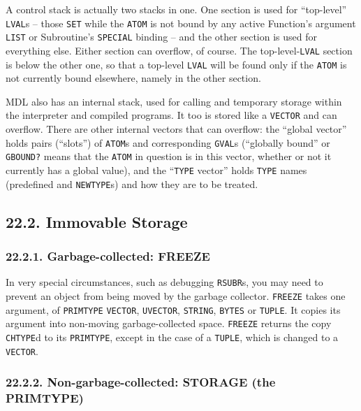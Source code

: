 \documentclass[a4paper,]{article}
\begin{document}
A control stack is actually two stacks in one. One section is used for ``top-level'' \texttt{LVAL}s -- those \texttt{SET}
while the \texttt{ATOM} is not bound by any active Function's argument \texttt{LIST} or Subroutine's
\texttt{SPECIAL} binding -- and the other section is used for everything else. Either section can
overflow, of course. The top-level-\texttt{LVAL} section is below the other one, so that a top-level \texttt{LVAL} will be
found only if the \texttt{ATOM} is not currently bound elsewhere, namely in the other section.

MDL also has an internal stack, used for calling and temporary storage within the interpreter and compiled programs. It too
is stored like a \texttt{VECTOR} and can overflow. There are other internal vectors that can overflow: the ``global
vector'' holds pairs (``slots'') of \texttt{ATOM}s and corresponding \texttt{GVAL}s (``globally
bound'' or \texttt{GBOUND?} means that the \texttt{ATOM} in question is in this vector, whether or
not it currently has a global value), and the ``\texttt{TYPE} vector'' holds \texttt{TYPE} names (predefined and
\texttt{NEWTYPE}s) and how they are to be treated.

\subsection{22.2. Immovable Storage}\label{immovable-storage}

\subsubsection{22.2.1. Garbage-collected: FREEZE}\label{garbage-collected-freeze}

In very special circumstances, such as debugging \texttt{RSUBR}s, you may need to prevent an object from being moved by the
garbage collector. \texttt{FREEZE} takes one argument, of \texttt{PRIMTYPE} \texttt{VECTOR},
\texttt{UVECTOR}, \texttt{STRING}, \texttt{BYTES} or \texttt{TUPLE}. It copies its argument into non-moving
garbage-collected space. \texttt{FREEZE} returns the copy \texttt{CHTYPE}d to its \texttt{PRIMTYPE}, except in the case of
a \texttt{TUPLE}, which is changed to a \texttt{VECTOR}.

\subsubsection{22.2.2. Non-garbage-collected: STORAGE (the PRIMTYPE)}\label{non-garbage-collected-storage-the-primtype}
\end{document}
